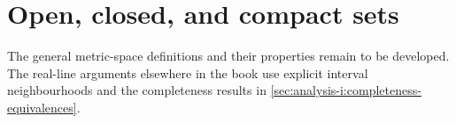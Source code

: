 \section{Open, closed, and compact sets}
\label{sec:analysis-i:open-closed-and-compact-sets}

The general metric-space definitions and their
properties remain to be developed. The real-line arguments elsewhere in
the book use explicit interval neighbourhoods and the completeness
results in \autoref{sec:analysis-i:completeness-equivalences}.
